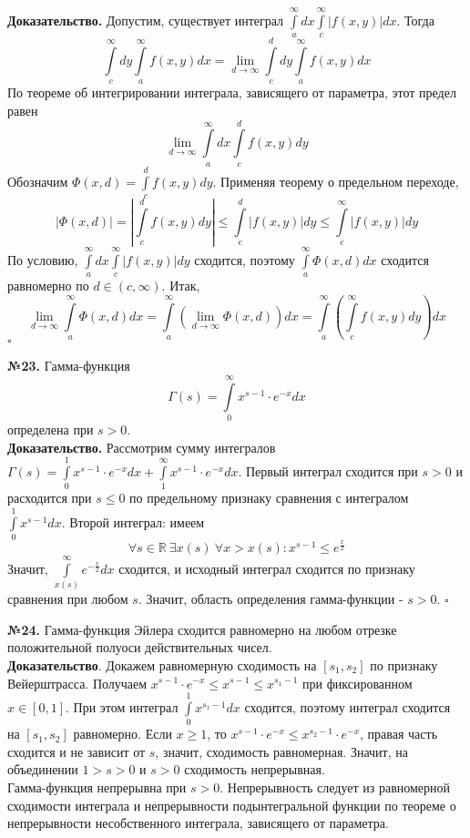 \textbf{Доказательство.} Допустим, существует интеграл  
$\int\limits_{a}^{\infty}dx \int\limits_{c}^{\infty}|f(x,y)|dx$.
Тогда 
$$\int\limits_{c}^{\infty}dy \int\limits_{a}^{\infty}f(x,y)dx=
\lim\limits_{d \to \infty} \int\limits_{c}^{d} dy \int\limits_{a}^{\infty} 
f(x,y)dx$$
По теореме об интегрировании интеграла, зависящего от параметра, этот предел
равен
$$\lim\limits_{d \to \infty}\int\limits_{a}^{\infty}dx
\int\limits_{c}^{d}f(x,y)dy$$
Обозначим $\Phi(x,d)=\int\limits_{c}^{d}f(x,y)dy$. Применяя теорему о 
предельном переходе, 
$$|\Phi(x,d)|=\left| \int\limits_{c}^{d} f(x,y)dy \right|\leqslant 
\int\limits_{c}^{d} |f(x,y)|dy\leqslant \int\limits_{c}^{\infty}|f(x,y)|dy
$$
По условию, $\int\limits_{a}^{\infty}dx \int\limits_{c}^{\infty}|f(x,y)|dy$ 
сходится, поэтому $\int\limits_{a}^{\infty}\Phi(x,d)dx$ сходится 
равномерно по $d\in (c,\infty)$. Итак,
$$\lim\limits_{d \to \infty}\int\limits_{a}^{\infty}\Phi(x,d)dx=
\int\limits_{a}^{\infty} \left( \lim\limits_{d \to \infty}\Phi(x,d)\right)dx=
\int\limits_{a}^{\infty}\left( \int\limits_{c}^{\infty}f(x,y)dy \right)dx $$
$\square$ 

\textbf{№23.} Гамма-функция 
$$\Gamma(s)=\int\limits_{0}^{\infty}x^{s-1}\cdot e^{-x}dx$$
определена при $s>0$.\\
\textbf{Доказательство.} Рассмотрим сумму интегралов
$\Gamma(s)=\int\limits_{0}^{1}x^{s-1}\cdot e^{-x}dx+
\int\limits_{1}^{\infty}x^{s-1}\cdot e^{-x}dx$. 
Первый интеграл сходится при $s>0$ и расходится при $s\leqslant 0$
по предельному признаку сравнения с интегралом
$\int\limits_{0}^{1}x^{s-1}dx$. Второй интеграл: имеем
$$\forall s\in \mathbb{R}~\exists x(s)~\forall x>x(s):
x^{s-1}\leqslant e^{\frac{x}{2}}$$ 
Значит, $\int\limits_{x(s)}^{\infty}e^{-\frac{x}{2}}dx$ сходится, и исходный
интеграл сходится по признаку сравнения при любом $s$. Значит, область 
определения гамма-функции -  $s>0$. $\square$ 

\textbf{№24.} Гамма-функция Эйлера сходится равномерно на любом
отрезке положительной полуоси действительных чисел.\\
\textbf{Доказательство}. Докажем равномерную сходимость на $[s_1,s_2]$
по признаку Вейерштрасса. Получаем 
$x^{s-1}\cdot e^{-x}\leqslant x^{s-1}\leqslant x^{s_1-1}$ при фиксированном
$x\in [0,1]$. При этом интеграл $\int\limits_{0}^{1}x^{s_1-1}dx$ сходится, 
поэтому интеграл сходится на $[s_1,s_2]$ равномерно. Если $x\geqslant 1$,
то $x^{s-1}\cdot e^{-x}\leqslant x^{s_2-1}\cdot e^{-x}$, правая часть 
сходится и не зависит от $s$, значит, сходимость равномерная. Значит,
на объединении $1>s>0$ и  $s>0$ сходимость непрерывная.\\
Гамма-функция непрерывна при $s>0$. Непрерывность следует из равномерной 
сходимости интеграла и непрерывности
подынтегральной функции по теореме о непрерывности несобственного интеграла,
зависящего от параметра.


